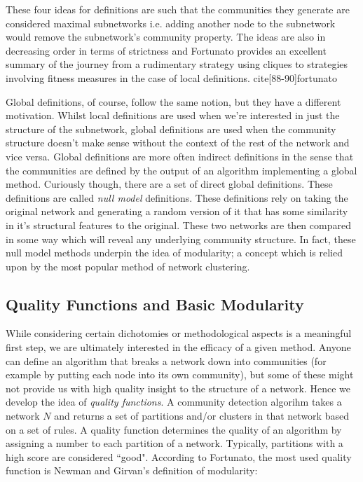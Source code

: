 These four ideas for definitions are such that the communities they generate are considered maximal subnetworks i.e. adding another node to the subnetwork would remove the subnetwork's community property. The ideas are also in decreasing order in terms of strictness and Fortunato provides an excellent summary of the journey from a rudimentary strategy using cliques to strategies involving fitness measures in the case of local definitions. cite[88-90]{fortunato}

Global definitions, of course, follow the same notion, but they have a different motivation. Whilst local definitions are used when we're interested in just the structure of the subnetwork, global definitions are used when the community structure doesn't make sense without the context of the rest of the network and vice versa. Global definitions are more often indirect definitions in the sense that the communities are defined by the output of an algorithm implementing a global method. Curiously though, there are a set of direct global definitions. These definitions are called \emph{null model} definitions. These definitions rely on taking the original network and generating a random version of it that has some similarity in it's structural features to the original. These two networks are then compared in some way which will reveal any underlying community structure. In fact, these null model methods underpin the idea of modularity; a concept which is relied upon by the most popular method of network clustering.

\subsection{Quality Functions and Basic Modularity}\label{sec:qfs and modularity}

While considering certain dichotomies or methodological aspects is a meaningful first step, we are ultimately interested in the efficacy of a given method. Anyone can define an algorithm that breaks a network down into communities (for example by putting each node into its own community), but some of these might not provide us with high quality insight to the structure of a network. Hence we develop the idea of \emph{quality functions}. A community detection algorihm takes a network $N$ and returns a set of partitions and/or clusters in that network based on a set of rules. A quality function determines the quality of an algorithm by assigning a number to each partition of a network. Typically, partitions with a high score are considered ``good". According to Fortunato, the most used quality function is Newman and Girvan's definition of modularity\cite[8]{newman_girvan}:

